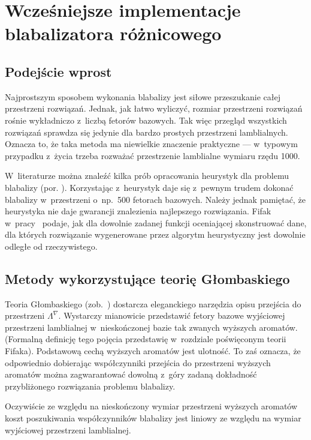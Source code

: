 
\chapter{Wcześniejsze implementacje blabalizatora
  różnicowego}\label{r:losers}

\section{Podejście wprost}

Najprostszym sposobem wykonania blabalizy jest siłowe przeszukanie
całej przestrzeni rozwiązań.  Jednak, jak łatwo wyliczyć, rozmiar
przestrzeni rozwiązań rośnie wykładniczo z~liczbą fetorów bazowych.
Tak więc przegląd wszystkich rozwiązań sprawdza się jedynie dla bardzo
prostych przestrzeni lamblialnych.  Oznacza to, że taka metoda ma
niewielkie znaczenie praktyczne --- w~typowym przypadku z~życia trzeba
rozważać przestrzenie lamblialne wymiaru rzędu 1000.

W~literaturze można znaleźć kilka prób opracowania heurystyk dla
problemu blabalizy (por. \cite{heu}).  Korzystając z~heurystyk daje
się z~pewnym trudem dokonać blabalizy w~przestrzeni o~np.~500 fetorach
bazowych.  Należy jednak pamiętać, że heurystyka nie daje gwarancji
znalezienia najlepszego rozwiązania.  Fifak w~pracy~\cite{ff-sr}
podaje, jak dla dowolnie zadanej funkcji oceniającej skonstruować
dane, dla których rozwiązanie wygenerowane przez algorytm heurystyczny
jest dowolnie odległe od rzeczywistego.

\section{Metody wykorzystujące teorię Głombaskiego}

Teoria Głombaskiego (zob.~\cite{grglo}) dostarcza eleganckiego
narzędzia opisu przejścia do przestrzeni $\Lambda^{\nabla}$.
Wystarczy mianowicie przedstawić fetory bazowe wyjściowej przestrzeni
lamblialnej w~nieskończonej bazie tak zwanych wyższych aromatów.
(Formalną definicję tego pojęcia przedstawię w~rozdziale poświęconym
teorii Fifaka).  Podstawową cechą wyższych aromatów jest ulotność.  To
zaś oznacza, że odpowiednio dobierając współczynniki przejścia do
przestrzeni wyższych aromatów można zagwarantować dowolną z~góry
zadaną dokładność przybliżonego rozwiązania problemu blabalizy.

Oczywiście ze względu na nieskończony wymiar przestrzeni wyższych
aromatów koszt poszukiwania współczynników blabalizy jest liniowy ze
względu na wymiar wyjściowej przestrzeni lamblialnej.

